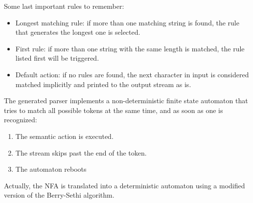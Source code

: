 \documentclass[12pt, a4paper]{report}
\begin{document}
    Some last important rules to remember:
    \begin{itemize}
        \item Longest matching rule: if more than one matching string is found, the rule that generates the longest one is selected. 
        \item First rule: if more than one string with the same length is matched, the rule listed first will be triggered. 
        \item Default action: if no rules are found, the next character in input is considered matched implicitly and printed to the output stream as is.
    \end{itemize}

    The generated parser implements a non-deterministic finite state automaton that tries to match all possible tokens at the same time, and as soon as one is recognized:
    \begin{enumerate}
        \item The semantic action is executed. 
        \item The stream skips past the end of the token. 
        \item The automaton reboots
    \end{enumerate}
    Actually, the NFA is translated into a deterministic automaton using a modified version of the Berry-Sethi algorithm. 
\end{document}
